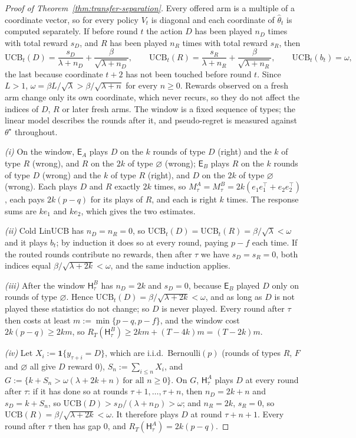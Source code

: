 \documentclass{article}
\theoremstyle{definition}
\theoremstyle{remark}
\newcommand{\ind}{\mathbf{1}}
\theoremstyle{remark}
\newcommand{\Exp}{\mathsf{E}}
\newcommand{\Hyb}{\mathsf{H}}
\begin{document}
\begin{proof}[Proof of Theorem~\ref{thm:transfer-separation}]
Every offered arm is a multiple of a coordinate vector, so for every policy
$V_t$ is diagonal and each coordinate of $\widehat\theta_t$ is computed
separately. If before round $t$ the action $D$ has been played $n_D$ times with
total reward $s_D$, and $R$ has been played $n_R$ times with total reward
$s_R$, then
\[
\mathrm{UCB}_t(D)=\frac{s_D}{\lambda+n_D}+\frac{\beta}{\sqrt{\lambda+n_D}},\qquad
\mathrm{UCB}_t(R)=\frac{s_R}{\lambda+n_R}+\frac{\beta}{\sqrt{\lambda+n_R}},\qquad
\mathrm{UCB}_t(b_t)=\omega,
\]
the last because coordinate $t+2$ has not been touched before round $t$.
Since $L>1$, $\omega=\beta L/\sqrt\lambda>\beta/\sqrt{\lambda+n}$ for every
$n\ge0$. Rewards observed on a fresh arm change only its own coordinate, which
never recurs, so they do not affect the indices of $D$, $R$ or later fresh
arms. The window is a fixed sequence of types; the linear model describes the
rounds after it, and pseudo-regret is measured against $\theta^\star$
throughout.

\emph{(i)} On the window, $\Exp_A$ plays $D$ on the $k$ rounds of type $D$
(right) and the $k$ of type $R$ (wrong), and $R$ on the $2k$ of type
$\varnothing$ (wrong); $\Exp_B$ plays $R$ on the $k$ rounds of type $D$ (wrong)
and the $k$ of type $R$ (right), and $D$ on the $2k$ of type $\varnothing$
(wrong). Each plays $D$ and $R$ exactly $2k$ times, so
$M^A_\tau=M^B_\tau=2k(e_1e_1^\top+e_2e_2^\top)$, each pays $2k(p-q)$ for its
plays of $R$, and each is right $k$ times. The response sums are $ke_1$ and
$ke_2$, which gives the two estimates.

\emph{(ii)} Cold LinUCB has $n_D=n_R=0$, so $\mathrm{UCB}_t(D)=\mathrm{UCB}_t(R)
=\beta/\sqrt\lambda<\omega$ and it plays $b_t$; by induction it does so at every
round, paying $p-f$ each time. If the routed rounds contribute no rewards, then
after $\tau$ we have $s_D=s_R=0$, both indices equal $\beta/\sqrt{\lambda+2k}<\omega$,
and the same induction applies.

\emph{(iii)} After the window $\Hyb^B_\tau$ has $n_D=2k$ and $s_D=0$, because
$\Exp_B$ played $D$ only on rounds of type $\varnothing$. Hence
$\mathrm{UCB}_t(D)=\beta/\sqrt{\lambda+2k}<\omega$, and as long as $D$ is not
played these statistics do not change; so $D$ is never played. Every round
after $\tau$ then costs at least $m:=\min\{p-q,p-f\}$, and the window cost
$2k(p-q)\ge2km$, so $R_T(\Hyb^B_\tau)\ge2km+(T-4k)m=(T-2k)m$.

\emph{(iv)} Let $X_i:=\ind\{y_{\tau+i}=D\}$, which are i.i.d.\ Bernoulli$(p)$
(rounds of types $R$, $F$ and $\varnothing$ all give $D$ reward $0$),
$S_n:=\sum_{i\le n}X_i$, and
$G:=\{k+S_n>\omega(\lambda+2k+n)\ \text{for all }n\ge0\}$. On $G$, $\Hyb^A_\tau$
plays $D$ at every round after $\tau$: if it has done so at rounds
$\tau+1,\dots,\tau+n$, then $n_D=2k+n$ and $s_D=k+S_n$, so
$\mathrm{UCB}(D)>s_D/(\lambda+n_D)>\omega$; and $n_R=2k$, $s_R=0$, so
$\mathrm{UCB}(R)=\beta/\sqrt{\lambda+2k}<\omega$. It therefore plays $D$ at round
$\tau+n+1$. Every round after $\tau$ then has gap $0$, and
$R_T(\Hyb^A_\tau)=2k(p-q)$.


\end{proof}
\end{document}

